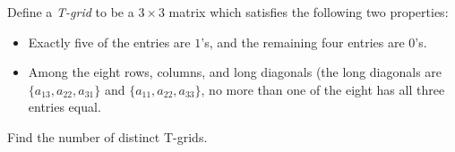 Define a \textit{T-grid} to be a $ 3\times3$ matrix which satisfies the following two properties:

\begin{itemize}
	\item Exactly five of the entries are $ 1$'s, and the remaining four entries are $ 0$'s.
	\item Among the eight rows, columns, and long diagonals (the long diagonals are $ \{a_{13},a_{22},a_{31}\}$ and $ \{a_{11},a_{22},a_{33}\}$, no more than one of the eight has all three entries equal.
\end{itemize}

Find the number of distinct T-grids.
